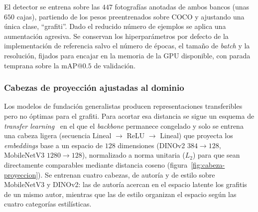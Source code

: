 El detector se entrena sobre las $447$ fotografías anotadas de ambos bancos
(unas $650$ cajas), partiendo de los pesos preentrenados sobre COCO y ajustando
una única clase, \enquote{grafiti}. Dado el reducido número de ejemplos se
aplica una aumentación agresiva. Se conservan los hiperparámetros por defecto
de la implementación de referencia salvo el número de épocas, el tamaño de
\textit{batch} y la resolución, fijados para encajar en la memoria de la GPU
disponible, con parada temprana sobre la mAP@$0.5$ de validación.

\subsubsection{Cabezas de proyección ajustadas al dominio}
\label{subsubsec:cabezas}
\label{subsubsec:entrenamiento-cabezas}
Los modelos de fundación generalistas producen representaciones transferibles
pero no óptimas para el grafiti. Para acortar esa distancia se sigue un esquema
de \textit{transfer learning}~\cite{pan_survey_2010,howard_universal_2018} en el
que el \textit{backbone} permanece congelado y solo se entrena una cabeza ligera
(secuencia Lineal $\rightarrow$ ReLU $\rightarrow$ Lineal) que proyecta los
\textit{embeddings} base a un espacio de $128$ dimensiones (DINOv2 $384\to128$,
MobileNetV3 $1280\to128$), normalizado a norma unitaria ($L_2$) para que sean
directamente comparables mediante distancia coseno
(figura~\ref{fig:cabeza-proyeccion}). Se entrenan cuatro cabezas, de autoría y
de estilo sobre MobileNetV3 y DINOv2: las de autoría acercan en el espacio
latente los grafitis de un mismo autor, mientras que las de estilo organizan el
espacio según las cuatro categorías estilísticas.

